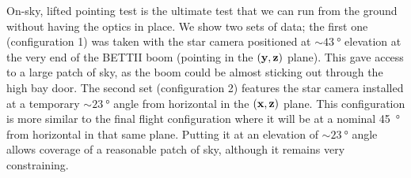On-sky, lifted pointing test is the ultimate test that we can run from the ground without having the optics in place. We show two sets of data; the first one (configuration 1) was taken with the star camera positioned at $\sim\SI{43}{\degree}$ elevation at the very end of the BETTII boom (pointing in the $(\textrm{\textbf{y}}, \textrm{\textbf{z}})$ plane). This gave access to a large patch of sky, as the boom could be almost sticking out through the high bay door. The second set (configuration 2) features the star camera installed at a temporary $\sim\SI{23}{\degree}$ angle from horizontal in the $(\textrm{\textbf{x}}, \textrm{\textbf{z}})$ plane. This configuration is more similar to the final flight configuration where it will be at a nominal \SI{45}{\degree} from horizontal in that same plane. Putting it at an elevation of $\sim\SI{23}{\degree}$ angle allows coverage of a reasonable patch of sky, although it remains very constraining.

